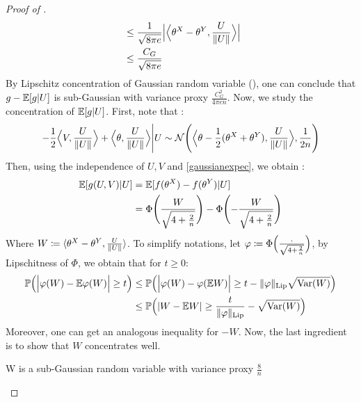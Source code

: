 \begin{proof}[Proof of ]
\begin{align*}
        & \leq \frac{1}{\sqrt{8\pi e}} \Big|\bigscal{\theta^X-\theta^Y}{\frac{U}{\norm{U}}} \Big| \\ 
        & \leq \frac{C_G}{\sqrt{8 \pi e}}
    \end{align*}
    By Lipschitz concentration of Gaussian random variable (), one can conclude that $g - \mathbb{E}[g|U]$ is sub-Gaussian with variance proxy $\frac{C_G^2}{4\pi en}$. Now, we study the concentration of $\mathbb{E}[g|U]$. First, note that : \begin{equation*}
        -\frac{1}{2} \Big\langle V,\frac{U}{\Vert U \Vert} \Big\rangle + \Big\langle \theta,\frac{U}{\Vert U \Vert} \Big\rangle \Bigg| U \sim \mathcal{N}\Biggl(\Big\langle \theta-\frac{1}{2}(\theta^X+\theta^Y),\frac{U}{\Vert U \Vert} \Big\rangle,\frac{1}{2n} \Biggr)
    \end{equation*}
    Then, using the independence of $U,V$ and \cref{gaussianexpec}, we obtain : \begin{align*}
        \mathbb{E}[g(U,V)|U] &= \mathbb{E}[f(\theta^X)-f(\theta^Y)|U] \\ 
        &= \Phi\Biggl(\frac{W}{\sqrt{4+\frac{2}{n}}}\Biggr)-\Phi\Biggl(-\frac{W}{\sqrt{4+\frac{2}{n}}}\Biggr)
    \end{align*}
    Where $W \coloneqq \langle \theta^X-\theta^Y,\frac{U}{\Vert U \Vert} \rangle$. To simplify notations, let $\varphi \coloneqq \Phi\Bigl(\frac{\cdot}{\sqrt{4+\frac{2}{n}}}\Bigr)$, by Lipschitness of $\Phi$, we obtain that for $t \geq 0$: \begin{align*}
        \mathbb{P}\Bigl( \Big|\varphi(W)-\mathbb{E}\varphi(W) \Big| \geq t\Bigr) &\leq \mathbb{P}\Bigl(\Big|\varphi(W) - \varphi(\mathbb{E} W)\Big|\geq t-\Vert \varphi \Vert_{\text{Lip}}\sqrt{\text{Var}(W)}\Bigr) \\
        &\leq  \mathbb{P} \Bigl(|W-\mathbb{E} W| \geq \frac{t}{\Vert \varphi \Vert_{\text{Lip}}}-\sqrt{\text{Var}(W)} \Bigr)
    \end{align*}
    Moreover, one can get an analogous inequality for $-W$. Now, the last ingredient is to show that $W$ concentrates well. 
\begin{lemma}\label{youssef}
    W is a sub-Gaussian random variable with variance proxy $\frac{8}{n}$
\end{lemma}


\end{proof}
